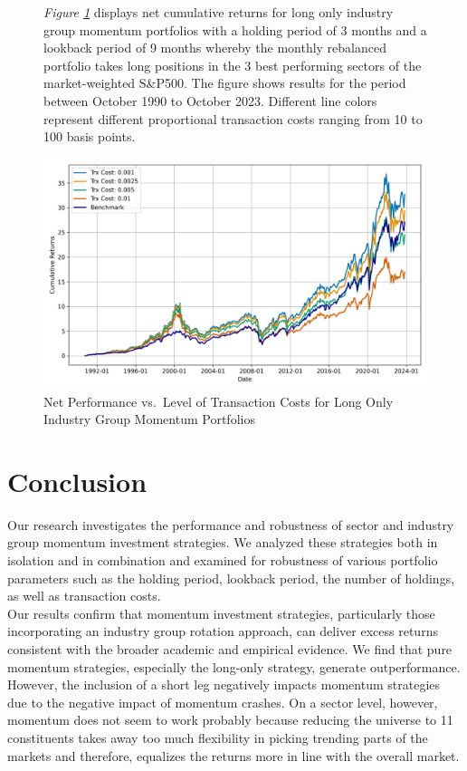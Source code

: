 \documentclass[a4paper,12pt,twoside]{article}
\begin{document}
\begin{figure}[H]
           \captionsetup{justification=centering}
   \caption{Net Performance vs.~Level of Transaction Costs for Long Only Industry Group Momentum Portfolios}
    \label{fig_03}
    \textit{Figure \ref{fig_03}} displays net cumulative returns for long only industry group momentum portfolios with a holding period of 3 months and a lookback period of 9 months whereby the monthly rebalanced portfolio takes long positions in the 3 best performing sectors of the market-weighted S\&P500. The figure shows results for the period between October 1990 to October 2023. Different line colors represent different proportional transaction costs ranging from 10 to 100 basis points.
    \centerline{\includegraphics[width=1\textwidth]{Plots/robustness_check_tc.png}}
\end{figure} 

\newpage
\section{Conclusion}
    Our research investigates the performance and robustness of sector and industry group momentum investment strategies. We analyzed these strategies both in isolation and in combination and examined for robustness of various portfolio parameters such as the holding period, lookback period, the number of holdings, as well as transaction costs.\\

    Our results confirm that momentum investment strategies, particularly those incorporating an industry group rotation approach, can deliver excess returns consistent with the broader academic and empirical evidence. We find that pure momentum strategies, especially the long-only strategy, generate outperformance. However, the inclusion of a short leg negatively impacts momentum strategies due to the negative impact of momentum crashes. On a sector level, however, momentum does not seem to work probably because reducing the universe to 11 constituents takes away too much flexibility in picking trending parts of the markets and therefore, equalizes the returns more in line with the overall market.\\
\end{document}
